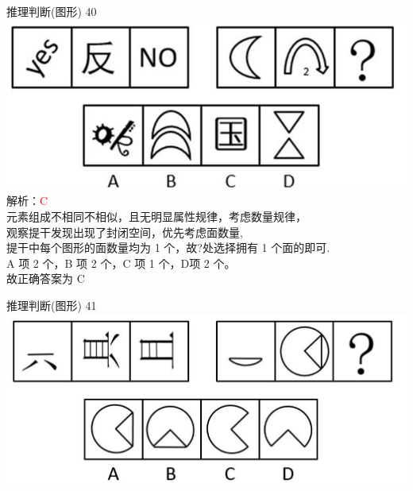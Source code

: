 \documentclass[aspectratio=169]{beamer}
\begin{document}
\begin{frame}[t]{推理判断(图形)}
    40\\
    \includegraphics[scale=0.25]{40}\\ 
    解析：\textcolor{red}{C}\\
    元素组成不相同不相似，且无明显属性规律，考虑数量规律，\\
    观察提干发现出现了封闭空间，优先考虑面数量,\\
    提干中每个图形的面数量均为 1 个，故?处选择拥有 1 个面的即可.\\
    A 项 2 个，B 项 2 个，C 项 1 个，D项 2 个。\\
    故正确答案为 C\\
\end{frame}


\begin{frame}[t]{推理判断(图形)}
    41\\
    \includegraphics[scale=0.25]{41}\\ 
\end{frame}
\end{document}
